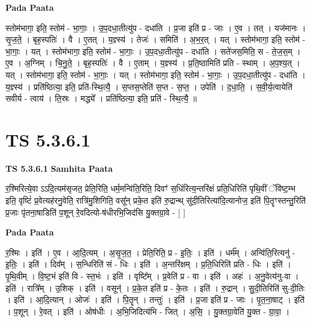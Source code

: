 \documentclass[17pt]{extarticle}
\begin{document}
\textbf{Pada Paata} \newline

स्तोम॑भागा॒ इति॒ स्तोम॑ - भा॒गाः॒ । उ॒प॒दधा॒तीत्यु॑प - दधा॑ति । प्र॒जा इति॑ प्र - जाः । ए॒व । तत् । यज॑मानः । सृ॒ज॒ते॒ । बृह॒स्पतिः॑ । वै । ए॒तत् । य॒ज्ञ्स्य॑ । तेजः॑ । समिति॑ । अ॒भ॒र॒त् । यत् । स्तोम॑भागा॒ इति॒ स्तोम॑ - भा॒गाः॒ । यत् । स्तोम॑भागा॒ इति॒ स्तोम॑ - भा॒गाः॒ । उ॒प॒दधा॒तीत्यु॑प - दधा॑ति । सते॑जस॒मिति॒ स - ते॒ज॒स॒म् । ए॒व । अ॒ग्निम् । चि॒नु॒ते॒ । बृह॒स्पतिः॑ । वै । ए॒ताम् । य॒ज्ञ्स्य॑ । प्र॒ति॒ष्ठामिति॑ प्रति - स्थाम् । अ॒प॒श्य॒त् । यत् । स्तोम॑भागा॒ इति॒ स्तोम॑ - भा॒गाः॒ । यत् । स्तोम॑भागा॒ इति॒ स्तोम॑ - भा॒गाः॒ । उ॒प॒दधा॒तीत्यु॑प - दधा॑ति । य॒ज्ञ्स्य॑ । प्रति॑ष्ठित्या॒ इति॒ प्रति॑-स्थि॒त्यै॒ । स॒प्तस॒प्तेति॑ स॒प्त - स॒प्त॒ । उपेति॑ । द॒धा॒ति॒ । स॒वी॒र्य॒त्वायेति॑ सवीर्य - त्वाय॑ । ति॒स्रः । मद्ध्ये᳚ । प्रति॑ष्ठित्या॒ इति॒ प्रति॑ - स्थि॒त्यै॒ ॥  \newline




\section*{ TS 5.3.6.1 }

\textbf{TS 5.3.6.1 } \newline
\textbf{Samhita Paata} \newline

र॒श्मिरित्ये॒वा ऽऽदि॒त्यम॑सृजत॒ प्रेति॒रिति॒ धर्म॒मन्वि॑ति॒रिति॒ दिवꣳ॑ स॒धिंरित्य॒न्तरि॑क्षं प्रति॒धिरिति॑ पृथि॒वीं ॅवि॑ष्ट॒म्भ इति॒ वृष्टिं॑ प्र॒वेत्यह॑रनु॒वेति॒ रात्रि॑मु॒शिगिति॒ वसू᳚न् प्रके॒त इति॑ रु॒द्रान्थ् सु॑दी॒तिरित्या॑दि॒त्यानोज॒ इति॑ पि॒तॄꣳस्तन्तु॒रिति॑ प्र॒जाः पृ॑तना॒षाडिति॑ प॒शून् रे॒वदित्यो-ष॑धीरभि॒जिद॑सि यु॒क्तग्रा॒वे - [  ] \newline

\textbf{Pada Paata} \newline

र॒श्मिः । इति॑ । ए॒व । आ॒दि॒त्यम् । अ॒सृ॒ज॒त॒ । प्रेति॒रिति॒ प्र - इ॒तिः॒ । इति॑ । धर्म᳚म् । अन्वि॑ति॒रित्यनु॑ - इ॒तिः॒ । इति॑ । दिव᳚म् । स॒न्धिरिति॑ सं - धिः । इति॑ । अ॒न्तरि॑क्षम् । प्र॒ति॒धिरिति॑ प्रति - धिः । इति॑ । पृ॒थि॒वीम् । वि॒ष्ट॒भं इति॑ वि - स्त॒भंः । इति॑ । वृष्टि᳚म् । प्र॒वेति॑ प्र - वा । इति॑ । अहः॑ । अ॒नु॒वेत्य॑नु-वा । इति॑ । रात्रि᳚म् । उ॒शिक् । इति॑ । वसून्॑ । प्र॒के॒त इति॑ प्र - के॒तः । इति॑ । रु॒द्रान् । सु॒दी॒तिरिति॑ सु-दी॒तिः । इति॑ । आ॒दि॒त्यान् । ओजः॑ । इति॑ । पि॒तॄन् । तन्तुः॑ । इति॑ । प्र॒जा इति॑ प्र - जाः । पृ॒त॒ना॒षाट् । इति॑ । प॒शून् । रे॒वत् । इति॑ । ओष॑धीः । अ॒भि॒जिदित्य॑भि - जित् । अ॒सि॒ । यु॒क्तग्रा॒वेति॑ यु॒क्त - ग्रा॒वा॒ ।  \newline
\end{document}
